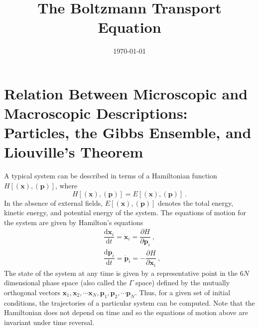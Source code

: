 \documentclass[12pt,a4paper]{article}
\title{The Boltzmann Transport Equation}
\author{}
\date{\today}
\renewcommand{\vec}[1]{\boldsymbol{#1}}
\newcommand{\dif}{\mathrm{d}}
\begin{document}
\maketitle

\section{Relation Between Microscopic and Macroscopic Descriptions: Particles, the Gibbs Ensemble, and Liouville's Theorem}
A typical system can be described in terms of a Hamiltonian function $H[(\vec{x}), (\vec{p})]$, where
\begin{equation}
H[(\vec{x}), (\vec{p})] = E[(\vec{x}), (\vec{p})] ~.
\end{equation}
In the absence of external fields, $E[(\vec{x}), (\vec{p})]$ denotes the total energy, kinetic energy, and potential energy of the system. The equations of motion for the system are given by Hamilton's equations
\begin{align}
& \dfrac{\dif \vec{x}_i}{\dif t} = \dot{\vec{x}}_i = \dfrac{\partial H}{\partial \vec{p}_i} ~, \\
& \dfrac{\dif \vec{p}_i}{\dif t} = \dot{\vec{p}}_i = -\dfrac{\partial H}{\partial \vec{x}_i} ~, 
\end{align}
The state of the system at any time is given by a representative point in the $6N$ dimensional phase space (also called the $\Gamma$ space) defined by the mutually orthogonal vectors $\vec{x}_1, \vec{x}_2, \cdots \vec{x}_N, \vec{p}_1, \vec{p}_2, \cdots \vec{p}_N$. Thus, for a given set of initial conditions, the trajectories of a particular system can be computed. Note that the Hamiltonian does not depend on time and so the equations of motion above are invariant under time reversal.
\end{document}
